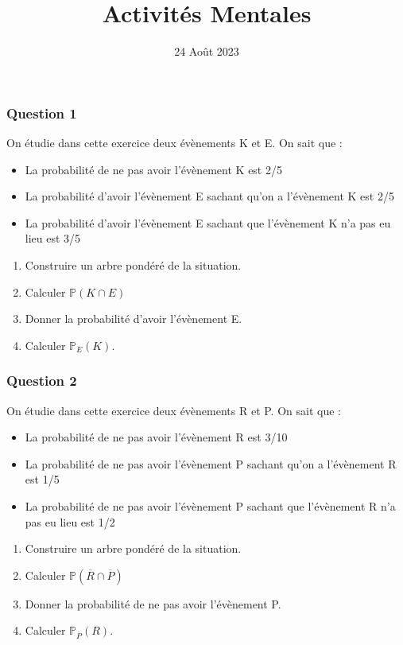 \documentclass[15pt, mathserif]{beamer}
\title{Activités Mentales}
\date{24 Août 2023}
\newcommand{\Prem}{\mathbb{P}}	%
\begin{document}
\begin{frame}
    \titlepage
\end{frame}

\begin{frame} 
	\frametitle{Question 1}
On étudie dans cette exercice deux évènements K et E. On sait que : 
 
 \begin{itemize} 
 	 \item La probabilité de ne pas avoir l'évènement K est 2/5
 	  \item La probabilité d'avoir l'évènement E sachant qu'on a l'évènement K est 2/5
 	  \item La probabilité d'avoir l'évènement E sachant que l'évènement K n'a pas eu lieu est 3/5
 \end{itemize} 
 
 \begin{enumerate} 
 	 \item Construire un arbre pondéré de la situation. 
 	 \item Calculer $\Prem(K\cap E)$
 	 \item Donner la probabilité d'avoir l'évènement E. 
 \item Calculer $\Prem_{E}(K)$. 
 \end{enumerate} \end{frame}


\begin{frame} 
	\frametitle{Question 2}
On étudie dans cette exercice deux évènements R et P. On sait que : 
 
 \begin{itemize} 
 	 \item La probabilité de ne pas avoir l'évènement R est 3/10 
 	 \item La probabilité de ne pas avoir l'évènement P sachant qu'on a l'évènement R est 1/5 
 	 \item La probabilité de ne pas avoir l'évènement P sachant que l'évènement R n'a pas eu lieu est 1/2
 \end{itemize} 
 
 \begin{enumerate} 
 	 \item Construire un arbre pondéré de la situation. 
 	 \item Calculer $\Prem(\overline{R} \cap \overline{P})$
 	 \item Donner la probabilité de ne pas avoir l'évènement P. 
 \item Calculer $\Prem_{\overline{P}}(R)$. 
 \end{enumerate} \end{frame}
\end{document}
